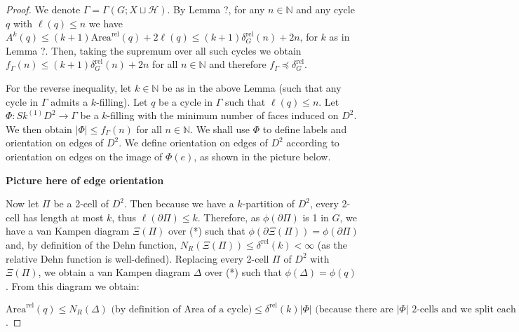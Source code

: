 \documentclass[12pt]{article}
\newcommand{\vs}{\vskip10pt}
\begin{document}
	\begin{proof}
		
		We denote $\Gamma = \Gamma(G; X \sqcup \mathcal{H})$. By Lemma ?, for any $n \in \mathbb{N}$ and any cycle $q$ with $\ell(q) \leq n$ we have $A^{k}(q) \leq (k+1) \text{Area}^{\text{rel}}(q) + 2 \ell(q) \leq (k+1) \delta_G^{\text{rel}}(n) + 2n$, for $k$ as in Lemma ?. Then, taking the supremum over all such cycles we obtain $f_{\Gamma} (n) \leq (k+1) \delta_G^{\text{rel}}(n) + 2n$ for all $n \in \mathbb{N}$ and therefore $f_{\Gamma} \preccurlyeq \delta_G^{\text{rel}}$. 
		
		\vs 
		
		For the reverse inequality, let $k \in \mathbb{N}$ be as in the above Lemma (such that any cycle in $\Gamma$ admits a $k$-filling). Let $q$ be a cycle in $\Gamma$ such that $\ell(q) \leq n$. Let $\Phi: Sk^{(1)} D^2 \rightarrow \Gamma$ be a $k$-filling with the minimum number of faces induced on $D^2$. We then obtain $\vert \Phi \vert \leq f_{\Gamma}(n)$ for all $n \in \mathbb{N}$. We shall use $\Phi$ to define labels and orientation on edges of $D^2$. We define orientation on edges of $D^2$ according to orientation on edges on the image of $\Phi(e)$, as shown in the picture below. 
		
		\textbf{Picture here of edge orientation} 
		
		\vs 
		
		Now let $\Pi$ be a 2-cell of $D^2$. Then because we have a $k$-partition of $D^2$, every 2-cell has length at most $k$, thus $\ell(\partial \Pi) \leq k$. Therefore, as $\phi(\partial \Pi)$ is 1 in $G$, we have a van Kampen diagram $\Xi(\Pi)$ over (*) such that $\phi(\partial \Xi(\Pi)) = \phi(\partial \Pi)$ and, by definition of the Dehn function, $N_{R} (\Xi(\Pi)) \leq \delta^{\text{rel}}(k) < \infty$ (as the relative Dehn function is well-defined). Replacing every 2-cell $\Pi$ of $D^2$ with $\Xi(\Pi)$, we obtain a van Kampen diagram $\Delta$ over (*) such that $\phi(\Delta) = \phi(q)$. From this diagram we obtain: 
		
		\vs 
		
		$\text{Area}^{\text{rel}}(q) \leq N_R (\Delta) \text{ (by definition of Area of a cycle)} \leq \delta^{\text{rel}}(k) \vert \Phi \vert \text{ (because there are } \vert \Phi \vert \text{ 2-cells and we split each 2-cell into }  N_{R} (\Xi(\Pi)) \leq \delta^{\text{rel}}(k) \text{ smaller 2-cells)} \leq f_{\Gamma} (n) \delta^{\text{rel}}(k) \text{ (because  } \vert \Phi \vert \leq f_{\Gamma}(n) )$.
		
	\end{proof}
\end{document}

